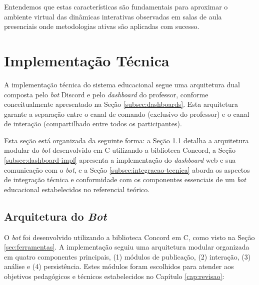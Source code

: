 Entendemos que estas características são fundamentais para aproximar o ambiente
virtual das dinâmicas interativas observadas em salas de aula presenciais onde
metodologias ativas são aplicadas com sucesso.

\section{Implementação Técnica}
\label{sec:implementacao}

A implementação técnica do sistema educacional segue uma arquitetura dual
composta pelo \textit{bot} Discord e pelo \textit{dashboard} do professor,
conforme conceitualmente apresentado na Seção \ref{subsec:dashboards}. Esta
arquitetura garante a separação entre o canal de comando (exclusivo do
professor) e o canal de interação (compartilhado entre todos os participantes).

Esta seção está organizada da seguinte forma: a Seção
\ref{subsec:arquitetura-bot} detalha a arquitetura modular do \textit{bot}
desenvolvido em C utilizando a biblioteca Concord, a Seção
\ref{subsec:dashboard-impl} apresenta a implementação do \textit{dashboard} web
e sua comunicação com o \textit{bot}, e a Seção \ref{subsec:integracao-tecnica}
aborda os aspectos de integração técnica e conformidade com os componentes
essenciais de um \textit{bot} educacional estabelecidos no referencial teórico.

\subsection{Arquitetura do \textit{Bot}}
\label{subsec:arquitetura-bot}

O \textit{bot} foi desenvolvido utilizando a biblioteca Concord em C, como visto
na Seção \ref{sec:ferramentas}. A implementação seguiu uma arquitetura modular
organizada em quatro componentes principais, (1) módulos de publicação, (2)
interação, (3) análise e (4) persistência. Estes módulos foram escolhidos para
atender aos objetivos pedagógicos e técnicos estabelecidos no Capítulo
\ref{cap:revisao}:

